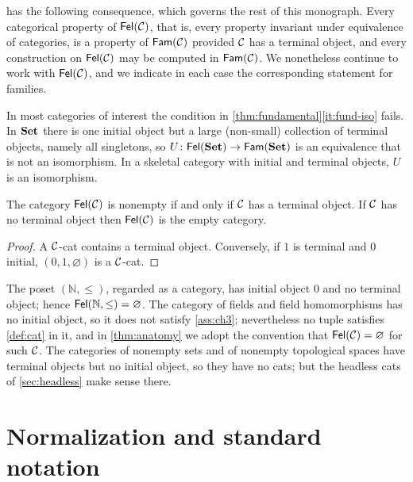 \begin{remark}\label{rem:fundamental-meaning}
 has the following consequence, which governs the rest
of this monograph. Every categorical property of $\mathsf{Fel}(\mathcal{C})$, that is,
every property invariant under equivalence of categories, is a property of
$\mathsf{Fam}(\mathcal{C})$ provided $\mathcal{C}$ has a terminal object, and every construction on
$\mathsf{Fel}(\mathcal{C})$ may be computed in $\mathsf{Fam}(\mathcal{C})$. We nonetheless continue to work
with $\mathsf{Fel}(\mathcal{C})$, and we indicate in each case the corresponding statement for
families.
\end{remark}

\begin{remark}\label{rem:not-iso}
In most categories of interest the condition in
\cref{thm:fundamental}\ref{it:fund-iso} fails. In $\mathbf{Set}$ there is one initial
object but a large (non-small) collection of terminal objects, namely all
singletons, so
$U\colon\mathsf{Fel}(\mathbf{Set})\to\mathsf{Fam}(\mathbf{Set})$ is an equivalence that is not an
isomorphism. In a skeletal category with initial and terminal objects, $U$ is
an isomorphism.
\end{remark}

\begin{proposition}\label{prop:existence}
The category $\mathsf{Fel}(\mathcal{C})$ is nonempty if and only if $\mathcal{C}$ has a terminal
object. If $\mathcal{C}$ has no terminal object then $\mathsf{Fel}(\mathcal{C})$ is the empty category.
\end{proposition}

\begin{proof}
A $\mathcal{C}$-cat contains a terminal object. Conversely, if $1$ is terminal and $0$
initial, $(0,1,\varnothing)$ is a $\mathcal{C}$-cat.
\end{proof}

\begin{example}\label{ex:no-terminal}
The poset $(\mathbb N,\le)$, regarded as a category, has initial object $0$ and
no terminal object; hence $\mathsf{Fel}(\mathbb N,\le)=\varnothing$. The category of
fields and field homomorphisms has no initial object, so it does not satisfy
\cref{ass:ch3}; nevertheless no tuple satisfies \cref{def:cat} in it, and in
\cref{thm:anatomy} we adopt the convention that $\mathsf{Fel}(\mathcal{C})=\varnothing$ for such
$\mathcal{C}$. The categories of nonempty sets and of nonempty topological spaces have
terminal objects but no initial object, so they have no cats; but the headless
cats of \cref{sec:headless} make sense there.
\end{example}

\section{Normalization and standard notation}\label{sec:normalization}

